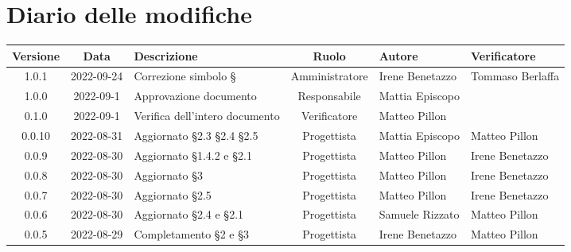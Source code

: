 \section*{Diario delle modifiche}
	\begin{center}
	\renewcommand{\arraystretch}{1.8} %
	\begin{longtable}{ |c|c|p{8em}|c|m{5em}|m{6em}| }
	\hline
	\textbf{Versione} & \textbf{Data} & \textbf{Descrizione} &  \textbf{Ruolo} &  \textbf{Autore} & \textbf{Verificatore}\\ %
	\hline %
	1.0.1 & 2022-09-24 & Correzione simbolo § & Amministratore & Irene \newline Benetazzo & Tommaso \newline Berlaffa \\ 
	\hline
	1.0.0 & 2022-09-1 & Approvazione documento & Responsabile & Mattia \newline Episcopo & \\ 
	\hline
	0.1.0 & 2022-09-1 & Verifica dell'intero documento & Verificatore & Matteo \newline Pillon & \\ 
	\hline
	0.0.10 & 2022-08-31 & Aggiornato §2.3 §2.4 §2.5 & Progettista & Mattia \newline Episcopo & Matteo \newline Pillon\\ 
	\hline
	0.0.9 & 2022-08-30 & Aggiornato §1.4.2 e §2.1 & Progettista & Matteo \newline Pillon & Irene \newline Benetazzo\\ 
	\hline
	0.0.8 & 2022-08-30 & Aggiornato §3 & Progettista & Matteo \newline Pillon & Irene \newline Benetazzo\\ 
	\hline
	0.0.7 & 2022-08-30 & Aggiornato §2.5 & Progettista & Matteo \newline Pillon & Irene \newline Benetazzo\\ 
	\hline
	0.0.6 & 2022-08-30 & Aggiornato §2.4 e §2.1 & Progettista & Samuele \newline Rizzato & Matteo Pillon \\ 
	\hline
	0.0.5 & 2022-08-29 & Completamento §2 e §3 & Progettista & Irene \newline Benetazzo & Matteo \newline Pillon\\ 

\end{longtable}
\end{center}
